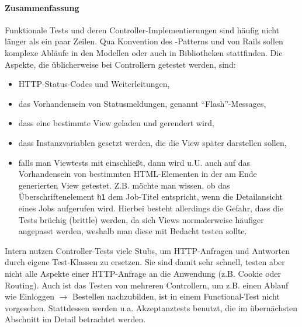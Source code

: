 \paragraph{Zusammenfassung}
Funktionale Tests und deren Controller-Implementierungen sind häufig nicht länger als ein paar Zeilen. Qua Konvention des -Patterns und von Rails sollen komplexe Abläufe in den Modellen oder auch in Bibliotheken stattfinden.
Die Aspekte, die üblicherweise bei Controllern getestet werden, sind:
\begin{itemize}
 \item HTTP-Status-Codes und Weiterleitungen,
 \item das Vorhandensein von Statusmeldungen, genannt "`Flash"'-Messages,
 \item dass eine bestimmte View geladen und gerendert wird,
 \item dass Instanzvariablen gesetzt werden, die die View später darstellen sollen,
 \item falls man Viewtests mit einschließt, dann wird u.U. auch auf das Vorhandensein von bestimmten HTML-Elementen in der am Ende generierten View getestet. Z.B. möchte man wissen, ob das Überschriftenelement \texttt{h1} dem Job-Titel entspricht, wenn die Detailansicht eines Jobs aufgerufen wird. Hierbei besteht allerdings die Gefahr, dass die Tests brüchig (brittle) werden, da sich Views normalerweise häufiger angepasst werden, weshalb man diese mit Bedacht testen sollte.
\end{itemize}

Intern nutzen Controller-Tests viele Stubs, um HTTP-Anfragen und Antworten durch eigene Test-Klassen zu ersetzen. Sie sind damit sehr schnell, testen aber nicht alle Aspekte einer HTTP-Anfrage an die Anwendung (z.B. Cookie oder Routing). Auch ist das Testen von mehreren Controllern, um z.B. einen Ablauf wie Einloggen $\to$ Bestellen nachzubilden, ist in einem Functional-Test nicht vorgesehen. Stattdessen werden u.a. Akzeptanztests benutzt, die im übernächsten Abschnitt im Detail betrachtet werden.
